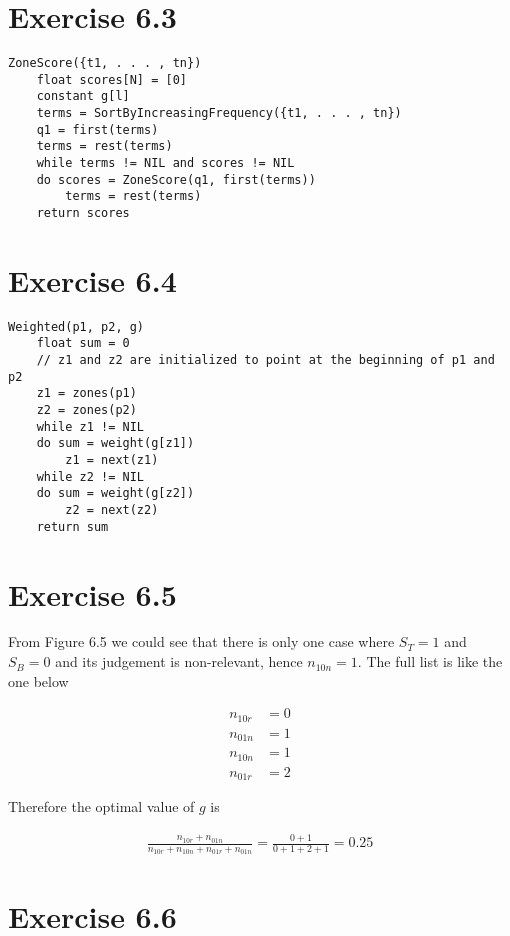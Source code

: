 \documentclass[11pt]{article} %
\begin{document}
\section*{Exercise 6.3}

\begin{lstlisting}
ZoneScore({t1, . . . , tn})
    float scores[N] = [0]
    constant g[l]
    terms = SortByIncreasingFrequency({t1, . . . , tn})
    q1 = first(terms)
    terms = rest(terms)
    while terms != NIL and scores != NIL
    do scores = ZoneScore(q1, first(terms))
        terms = rest(terms)
    return scores
\end{lstlisting}

\section*{Exercise 6.4}

\begin{lstlisting}
Weighted(p1, p2, g)
    float sum = 0
    // z1 and z2 are initialized to point at the beginning of p1 and p2
    z1 = zones(p1)
    z2 = zones(p2)
    while z1 != NIL
    do sum = weight(g[z1])
        z1 = next(z1)
    while z2 != NIL
    do sum = weight(g[z2])
        z2 = next(z2)
    return sum
\end{lstlisting}

\section*{Exercise 6.5}

From Figure 6.5 we could see that there is only one case where $S_T = 1$ and $S_B = 0$ and its judgement is non-relevant, hence $n_{10n} = 1$. The full list is like the one below

\begin{align*}
    n_{10r} &= 0\\
    n_{01n} &= 1\\
    n_{10n} &= 1\\
    n_{01r} &= 2
\end{align*}

Therefore the optimal value of $g$ is

\begin{align*}
    \frac{n_{10r} + n_{01n}}{n_{10r} + n_{10n} + n_{01r} + n_{01n}} = \frac{0 + 1}{0 + 1 + 2 + 1} = 0.25
\end{align*}

\section*{Exercise 6.6}
\end{document}
